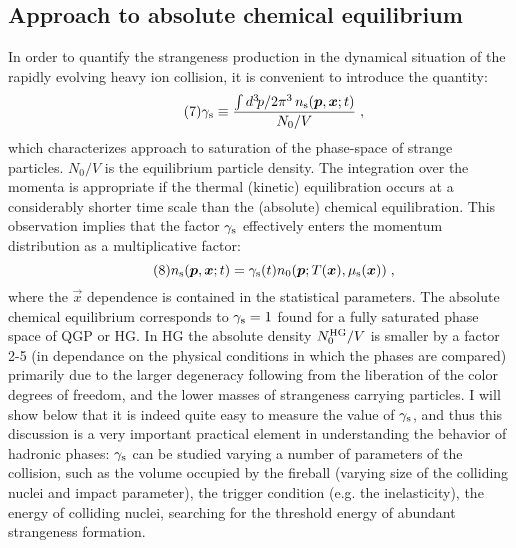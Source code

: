 \begin{mdframed}[linecolor=gray,roundcorner=12pt,backgroundcolor=Dandelion!15,linewidth=1pt,leftmargin=0cm,rightmargin=0cm,topline=true,bottomline=true,skipabove=12pt]
\section*{Approach to absolute chemical equilibrium}
In order to quantify the strangeness production in the dynamical
situation of the rapidly evolving heavy ion collision, it is convenient
to introduce the  quantity:
\begin{equation}\tag{7}
\gamma_{\rm s}\equiv {\int d^3\!p/ 2\pi^3\,
     n_{\rm s}(\vec p,\vec x;t)\over N_0/V}\;,
\end{equation}
which characterizes approach to saturation of the phase-space of strange
particles. $N_0/V$ is the equilibrium particle density. The integration
over the momenta is appropriate if the thermal (kinetic) equilibration 
occurs at a considerably shorter time scale than the (absolute) chemical
equilibration. This observation implies that the factor $\gamma_{\rm s}$
effectively enters the momentum distribution as a multiplicative factor:
\begin{equation}\tag{8}
n_{\rm s}(\vec p,\vec x;t)=\gamma_{\rm s}(t)n_0(\vec p;T(\vec x),\mu_{\rm
s}(\vec x))\;,
\end{equation}
where the $\vec x$ dependence is contained in the statistical parameters.
The absolute chemical equilibrium corresponds to $\gamma_{\rm s}=1$ found
for a fully saturated phase space of QGP or HG. In HG the absolute
density $N_0^{\rm HG}/V$ is smaller by a factor 2-5 (in dependance on the
physical conditions in which the phases are compared) primarily due to
the larger degeneracy following from the liberation of the color degrees
of freedom, and the lower masses of strangeness carrying particles. I
will show below that it is indeed quite easy to measure the value of
$\gamma_{\rm s}$, and thus this discussion is a very important practical
element in understanding the behavior of hadronic phases: $\gamma_{\rm
s}$ can be studied varying a number of parameters of the collision, such
as the volume occupied by the fireball (varying size of the colliding
nuclei and impact parameter), the trigger condition (e.g. the
inelasticity), the energy of colliding nuclei, searching for the
threshold energy of abundant strangeness formation.
 

\end{mdframed}
